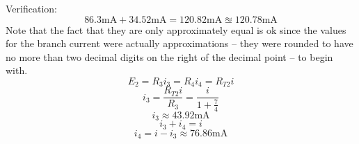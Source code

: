 \documentclass{article}
\begin{document}
	Verification:
	$$ 86.3\text{mA} + 34.52 \text{mA} = 120.82\text{mA} \approxeq 
	120.78\text{mA}$$
	Note that the fact that they are only approximately equal is ok since the 
	values for the branch current were actually approximations -- they were 
	rounded to have no more than two decimal digits on the right of the decimal 
	point -- to begin with.
	$$ E_2 = R_3i_3 = R_4i_4 = R_{T2}i $$
	$$ i_3 = \frac{R_{T2}i}{R_3} = \frac{i}{1+\frac{7}{4}}$$
	\begin{equation}\label{eq:current-3}
		i_3 \approx 43.92 \text{mA}
	\end{equation}
	$$ i_3 + i_4 = i$$
	\begin{equation}\label{eq:current-4}
		i_4 = i-i_3 \approx 76.86\text{mA}
	\end{equation}
\end{document}
